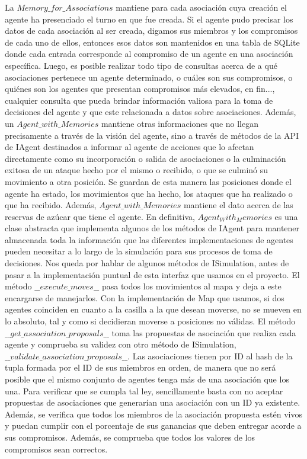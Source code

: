 \documentclass[11pt]{article}
\begin{document}
La $Memory\_for\_Associations$ mantiene para cada asociación cuya creación el agente ha presenciado el turno en que fue creada. Si el agente pudo precisar los datos de cada asociación al ser creada, digamos sus miembros y los compromisos de cada uno de ellos, entonces esos datos son mantenidos en una tabla de SQLite donde cada entrada corresponde al compromiso de un agente en una asociación específica. Luego, es posible realizar todo tipo de consultas acerca de a qué asociaciones pertenece un agente determinado, o cuáles son sus compromisos, o quiénes son los agentes que presentan compromisos más elevados, en fin..., cualquier consulta que pueda brindar información valiosa para la toma de decisiones del agente y que este relacionada a datos sobre asociaciones.
Además, un $Agent\_with\_Memories$ mantiene otras informaciones que no llegan precisamente a través de la visión del agente, sino a través de métodos de la API de IAgent destinados a informar al agente de acciones que lo afectan directamente como su incorporación o salida de asociaciones o la culminación exitosa de un ataque hecho por el mismo o recibido, o que se culminó su movimiento a otra posición. Se guardan de esta manera las posiciones donde el agente ha estado, los movimientos que ha hecho, los ataques que ha realizado o que ha recibido. Además, $Agent\_with\_Memories$ mantiene el dato acerca de las reservas de azúcar que tiene el agente.
En definitiva, $Agent_With_Memories$ es una clase abstracta que implementa algunos de los métodos de IAgent para mantener almacenada toda la información que las diferentes implementaciones de agentes pueden necesitar a lo largo de la simulación para sus procesos de toma de decisiones.
Nos queda por hablar de algunos métodos de ISimulation, antes de pasar a la implementación puntual de esta interfaz que usamos en el proyecto.
El método $\_\_execute\_moves\_\_$ pasa todos los movimientos al mapa y deja a este encargarse de manejarlos. Con la implementación de Map que usamos, si dos agentes coinciden en cuanto a la casilla a la que desean moverse, no se mueven en lo absoluto, tal y como si decidieran moverse a posiciones no válidas.
El método $\_\_get\_association\_proposals\_\_$ toma las propuestas de asociación que realiza cada agente y comprueba su validez con otro método de ISimulation, $\_\_validate\_association\_proposals\_\_$.
Las asociaciones tienen por ID al hash de la tupla formada por el ID de sus miembros en orden, de manera que no será posible que el mismo conjunto de agentes tenga más de una asociación que los una. Para verificar que se cumpla tal ley, sencillamente basta con no aceptar propuestas de asociaciones que generarían una asociación con un ID ya existente. Además, se verifica que todos los miembros de la asociación propuesta estén vivos y puedan cumplir con el porcentaje de sus ganancias que deben entregar acorde a sus compromisos. Además, se comprueba que todos los valores de los compromisos sean correctos.
\end{document}
